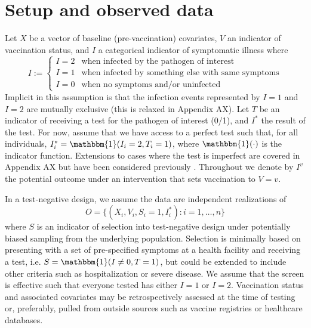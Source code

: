 \documentclass[11pt]{article}
\begin{document}
\section{Setup and observed data} \label{sec:setup}
Let $X$ be a vector of baseline (pre-vaccination) covariates, $V$ an indicator of vaccination status, and $I$ a categorical indicator of symptomatic illness where
        $$I := \begin{cases} 
        I = 2 & \text{when infected by the pathogen of interest} \\
        I = 1 & \text{when infected by something else with same symptoms} \\
        I = 0 & \text{when no symptoms and/or uninfected}
        \end{cases}$$
Implicit in this assumption is that the infection events represented by $I = 1$ and $I = 2$ are mutually exclusive (this is relaxed in Appendix AX). Let $T$ be an indicator of receiving a test for the pathogen of interest (0/1), and $I^*$ the result of the test. For now, assume that we have access to a perfect test such that, for all individuals, $I^*_i = \mathbbm{1}(I_i = 2, T_i = 1)$, where $\mathbbm{1}(\cdot)$ is the indicator function. Extensions to cases where the test is imperfect are covered in Appendix AX but have been considered previously \cite{jackson2015effects}. Throughout we denote by $I^v$ the potential outcome under an intervention that sets vaccination to $V=v$. 
    
In a test-negative design, we assume the data are independent realizations of 
$$O = \{(X_i, V_i, S_i = 1, I^*_i) : i = 1, \ldots, n\}$$
where $S$ is an indicator of selection into test-negative design under potentially biased sampling from the underlying population. Selection is minimally based on presenting with a set of pre-specified symptoms at a health facility and receiving a test, i.e. $S = \mathbbm{1}(I \neq 0, T = 1)$, but could be extended to include other criteria such as hospitalization or severe disease. We assume that the screen is effective such that everyone tested has either $I=1$ or $I=2$. Vaccination status and associated covariates may be retrospectively assessed at the time of testing or, preferably, pulled from outside sources such as vaccine registries or healthcare databases. 
\end{document}
